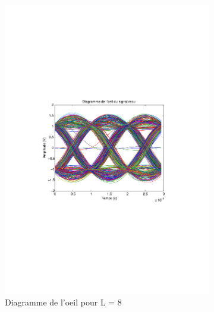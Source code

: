 \documentclass[a4paper,11pt]{article}
\begin{document}
\begin{figure}
	\begin{subfigure}{.5\textwidth}
  		\centering
  		\includegraphics[width=1\linewidth]{Q10-EbNo20.pdf}
  		\caption{Diagramme de l'oeil pour L = 8}
  		\label{fig:q10l16}
	\end{subfigure}
	\begin{subfigure}{.5\textwidth}
  		\centering

\end{subfigure}
\end{figure}
\end{document}
